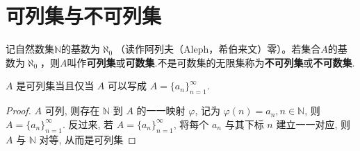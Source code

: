 \documentclass[../../main.tex]{subfiles}%
\begin{document}
\section{可列集与不可列集}

\begin{definition}
记自然数集\(\mathbb{N}\)的基数为\(\aleph_0\)（读作阿列夫（Aleph，希伯来文）零）。若集合\(A\)的基数为\(\aleph_0\)，则\(A\)叫作\textbf{可列集}或\textbf{可数集}.不是可数集的无限集称为\textbf{不可列集}或\textbf{不可数集}.
\end{definition}

\begin{proposition}\label{proposition:可列集的表示方式}
$A$ 是可列集当且仅当 $A$ 可以写成 $A = \{a_n\}_{n = 1}^{\infty}$.
\end{proposition}
\begin{proof}
$A$ 可列, 则存在 $\mathbb{N}$ 到 $A$ 的一一映射 $\varphi$, 记为 $\varphi(n) = a_n, n \in \mathbb{N}$, 则 $A = \{a_n\}_{n = 1}^{\infty}$. 反过来, 若 $A = \{a_n\}_{n = 1}^{\infty}$, 将每个 $a_n$ 与其下标 $n$ 建立一一对应, 则 $A$ 与 $\mathbb{N}$ 对等, 从而是可列集
\end{proof}
\end{document}
